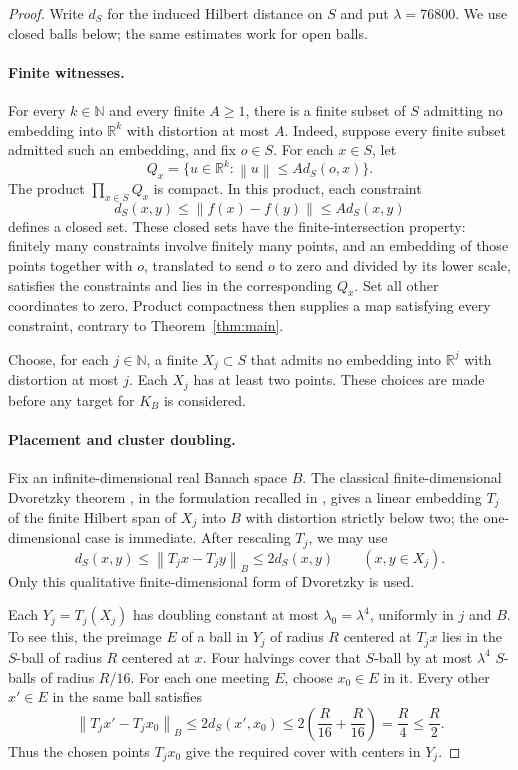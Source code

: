 \documentclass[11pt]{article}
\newcommand{\R}{\mathbb R}
\newcommand{\N}{\mathbb N}
\newcommand{\norm}[1]{\left\lVert#1\right\rVert}
\begin{document}
\begin{proof}
Write $d_S$ for the induced Hilbert distance on $S$ and put $\lambda=76800$. We use closed balls below; the same estimates work for open balls.

\paragraph{Finite witnesses.}
For every $k\in\N$ and every finite $A\ge1$, there is a finite subset of $S$ admitting no embedding into $\R^k$ with distortion at most $A$. Indeed, suppose every finite subset admitted such an embedding, and fix $o\in S$. For each $x\in S$, let
\[
 Q_x=\{u\in\R^k:\norm u\le A d_S(o,x)\}.
\]
The product $\prod_{x\in S}Q_x$ is compact. In this product, each constraint
\[
 d_S(x,y)\le\norm{f(x)-f(y)}\le A d_S(x,y)
\]
defines a closed set. These closed sets have the finite-intersection property: finitely many constraints involve finitely many points, and an embedding of those points together with $o$, translated to send $o$ to zero and divided by its lower scale, satisfies the constraints and lies in the corresponding $Q_x$. Set all other coordinates to zero. Product compactness then supplies a map satisfying every constraint, contrary to Theorem~\ref{thm:main}.

Choose, for each $j\in\N$, a finite $X_j\subset S$ that admits no embedding into $\R^j$ with distortion at most $j$. Each $X_j$ has at least two points. These choices are made before any target for $K_B$ is considered.

\paragraph{Placement and cluster doubling.}
Fix an infinite-dimensional real Banach space $B$. The classical finite-dimensional Dvoretzky theorem \cite[Section~7]{Dvoretzky}, in the formulation recalled in \cite[Theorem~1.1]{COO}, gives a linear embedding $T_j$ of the finite Hilbert span of $X_j$ into $B$ with distortion strictly below two; the one-dimensional case is immediate. After rescaling $T_j$, we may use
\[
 d_S(x,y)\le\norm{T_jx-T_jy}_B\le2d_S(x,y)
 \qquad(x,y\in X_j).
\]
Only this qualitative finite-dimensional form of Dvoretzky is used.

Each $Y_j=T_j(X_j)$ has doubling constant at most $\lambda_0=\lambda^4$, uniformly in $j$ and $B$. To see this, the preimage $E$ of a ball in $Y_j$ of radius $R$ centered at $T_jx$ lies in the $S$-ball of radius $R$ centered at $x$. Four halvings cover that $S$-ball by at most $\lambda^4$ $S$-balls of radius $R/16$. For each one meeting $E$, choose $x_0\in E$ in it. Every other $x'\in E$ in the same ball satisfies
\[
 \norm{T_jx'-T_jx_0}_B
 \le2d_S(x',x_0)
 \le2\left(\frac R{16}+\frac R{16}\right)
 =\frac R4\le\frac R2.
\]
Thus the chosen points $T_jx_0$ give the required cover with centers in $Y_j$.


\end{proof}
\end{document}

